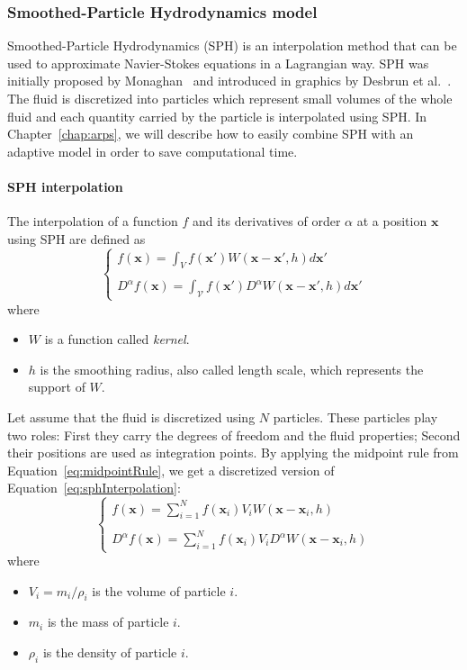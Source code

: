 \subsubsection{Smoothed-Particle Hydrodynamics model}
\label{subsubsec:starSPH}
Smoothed-Particle Hydrodynamics (SPH) is an interpolation method that can be used to approximate Navier-Stokes equations in a Lagrangian way. 
SPH was initially proposed by Monaghan~\cite{Monaghan1992} and introduced in graphics by Desbrun et al.~\cite{Desbrun1999}.
The fluid is discretized into particles which represent small volumes of the whole fluid and each quantity carried by the particle is interpolated using SPH.
In Chapter~\ref{chap:arps}, we will describe how to easily combine SPH with an adaptive model in order to save computational time.
\paragraph{SPH interpolation}
The interpolation of a function $f$ and its derivatives of order $\alpha$ at a position $\mathbf{x}$ using SPH are defined as
\begin{equation}
\label{eq:sphInterpolation}
\left\lbrace
\begin{array}{l}
\displaystyle f(\mathbf{x}) = \int_{V} f(\mathbf{x'})W(\mathbf{x}-\mathbf{x'}, h)d\mathbf{x'} \\ \\
\displaystyle D^{\alpha} f(\mathbf{x}) = \int_{\mathcal{V}} f(\mathbf{x'}) D^{\alpha} W(\mathbf{x}-\mathbf{x'}, h)d\mathbf{x'}
\end{array}
\right.
\end{equation}
where 
\begin{itemize}
	\item $W$ is a function called \emph{kernel}.
	\item $h$ is the smoothing radius, also called length scale, which represents the support of $W$.
\end{itemize} 
Let assume that the fluid is discretized using $N$ particles.
These particles play two roles: First they carry the degrees of freedom and the fluid properties; Second their positions are used as integration points. By applying the midpoint rule from Equation~\eqref{eq:midpointRule}, we get a discretized version of Equation~\eqref{eq:sphInterpolation}:
\begin{equation}
\label{eq:sphFunction}
\left\lbrace
\begin{array}{l}
\displaystyle f(\mathbf{x}) = \sum_{i=1}^{N} f(\mathbf{x}_{i})V_{i} W(\mathbf{x}-\mathbf{x}_{i},h) \\ \\
\displaystyle D^{\alpha} f(\mathbf{x})= \sum_{i=1}^{N} f(\mathbf{x}_{i})V_{i} D^{\alpha} W(\mathbf{x}-\mathbf{x}_{i},h)
\end{array}
\right.
\end{equation}
where 
\begin{itemize}
	\item $V_{i} = m_{i}/\rho_{i}$ is the volume of particle $i$.
	\item $m_{i}$ is the mass of particle $i$.
	\item $\rho_{i}$ is the density of particle $i$.
\end{itemize}
